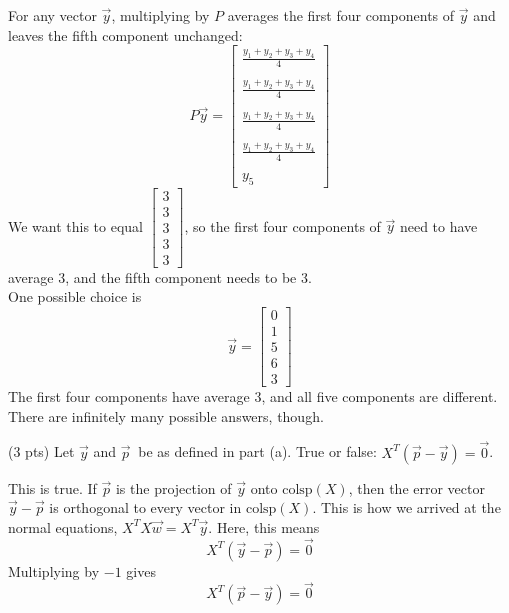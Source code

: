 \documentclass[11pt]{article}
\begin{document}
\begin{prob}[(19 pts)]
\begin{subprob}
\begin{solution}
For any vector $\vec y$, multiplying by $P$ averages the first four components of $\vec y$ and leaves the fifth component unchanged:
\[
P\vec y =
\begin{bmatrix}
\displaystyle \frac{y_1+y_2+y_3+y_4}{4} \\ \\
\displaystyle \frac{y_1+y_2+y_3+y_4}{4} \\ \\
\displaystyle \frac{y_1+y_2+y_3+y_4}{4} \\ \\
\displaystyle \frac{y_1+y_2+y_3+y_4}{4} \\ \\
\displaystyle y_5
\end{bmatrix}
\]
We want this to equal $\begin{bmatrix} 3 \\ 3 \\ 3 \\ 3 \\ 3 \end{bmatrix}$, so the first four components of $\vec y$ need to have average 3, and the fifth component needs to be 3. \\

One possible choice is
\[
\vec y =
\begin{bmatrix}
0 \\
1 \\
5 \\
6 \\
3
\end{bmatrix}
\]
The first four components have average 3, and all five components are different. There are infinitely many possible answers, though.
\end{solution}
\end{subprob}

\begin{subprob}(3 pts)
Let $\vec y$ and $\vec p \:$ be as defined in part (a). True or false: $X^T (\vec p - \vec y) = \vec 0$. \\

 

\begin{solution}
This is true. If $\vec p$ is the projection of $\vec y$ onto $\text{colsp}(X)$, then the error vector $\vec y - \vec p$ is orthogonal to every vector in $\text{colsp}(X)$. This is how we arrived at the normal equations, $X^TX \vec w = X^T \vec y$. Here, this means
\[
X^T(\vec y - \vec p) = \vec 0
\]
Multiplying by $-1$ gives
\[
X^T(\vec p - \vec y) = \vec 0
\]
\end{solution}
\end{subprob}


\end{prob}
\end{document}
